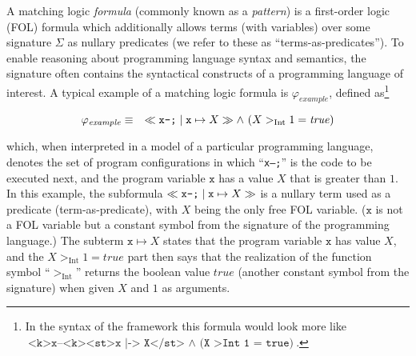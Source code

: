 

A matching logic \emph{formula} (commonly known as a \emph{pattern}) is a
first-order logic (FOL) formula which additionally allows terms (with variables)
over some signature $\Sigma$ as nullary predicates (we refer to these as ``terms-as-predicates'').
To enable reasoning about programming language syntax and semantics,
the signature often contains the syntactical constructs of a programming language of interest.
A typical example of a matching logic formula is $\varphi_{\mathit{example}}$,
defined as\footnote{In the syntax of the \K{} framework this formula would look more like
$\texttt{<k>x--<k><st>x |-> X</st> } \land \texttt{ (X >Int  1 = true)}$.}


\begin{equation}\label{eqn:exampleMLPattern}
    \varphi_{\mathit{example}} \equiv\quad \ll\texttt{x--;}\mid \texttt{x}\mapsto X\gg  \land\ (X >_\text{Int} 1 = \mathit{true})
\end{equation}


which, when interpreted in a model of a particular programming language,
denotes the set of program configurations in which ``\texttt{x--;}'' is the
code to be executed next, and the program variable $\texttt{x}$ has a value $X$
that is greater than $1$.  In this example, the subformula
$\ll\texttt{x--;}\mid \mathtt{x}\mapsto X\gg$ is a nullary term used as a predicate
(term-as-predicate), with $X$ being the only free FOL variable.  ($\texttt{x}$
is not a FOL variable but a constant symbol from the signature of the
programming language.)  The subterm $\texttt{x}\mapsto X$ states that the
program variable $\texttt{x}$ has value $X$, and the
$X >_\text{Int} 1 = \mathit{true}$ part then says that the realization of the
function symbol ``$>_\text{Int}$'' returns the boolean value $\mathit{true}$ (another constant symbol from the signature)
when given $X$ and $1$ as arguments.

